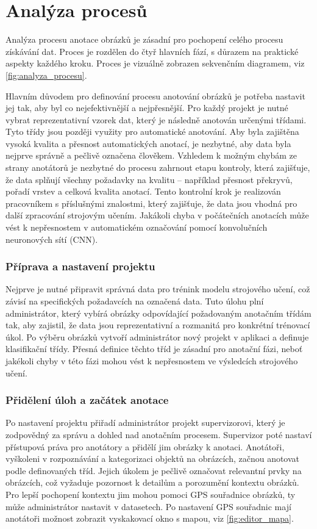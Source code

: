 \section{Analýza procesů}
Analýza procesu anotace obrázků je zásadní pro pochopení celého procesu získávání dat. Proces je rozdělen do čtyř hlavních fází, s důrazem na praktické aspekty každého kroku. Proces je vizuálně zobrazen sekvenčním diagramem, viz \vref{fig:analyza_procesu}.

Hlavním důvodem pro definování procesu anotování obrázků je potřeba nastavit jej tak, aby byl co nejefektivnější a nejpřesnější. Pro každý projekt je nutné vybrat reprezentativní vzorek dat, který je následně anotován určenými třídami. Tyto třídy jsou později využity pro automatické anotování. Aby byla zajištěna vysoká kvalita a přesnost automatických anotací, je nezbytné, aby data byla nejprve správně a pečlivě označena člověkem. Vzhledem k možným chybám ze strany anotátorů je nezbytné do procesu zahrnout etapu kontroly, která zajišťuje, že data splňují všechny požadavky na kvalitu – například přesnost překryvů, pořadí vrstev a celková kvalita anotací. Tento kontrolní krok je realizován pracovníkem s příslušnými znalostmi, který zajišťuje, že data jsou vhodná pro další zpracování strojovým učením. Jakákoli chyba v počátečních anotacích může vést k nepřesnostem v automatickém označování pomocí konvolučních neuronových sítí (CNN).


\subsubsection{Příprava a nastavení projektu}
  
  Nejprve je nutné připravit správná data pro trénink modelu strojového učení, což závisí na specifických požadavcích na označená data. Tuto úlohu plní administrátor, který vybírá obrázky odpovídající požadovaným anotačním třídám tak, aby zajistil, že data jsou reprezentativní a rozmanitá pro konkrétní trénovací úkol. Po výběru obrázků vytvoří administrátor nový projekt v aplikaci a definuje klasifikační třídy. Přesná definice těchto tříd je zásadní pro anotační fázi, neboť jakékoli chyby v této fázi mohou vést k nepřesnostem ve výsledcích strojového učení.


\subsubsection{Přidělení úloh a začátek anotace}
Po nastavení projektu přiřadí administrátor projekt supervizorovi, který je zodpovědný za správu a dohled nad anotačním procesem. Supervizor poté nastaví přístupová práva pro anotátory a přidělí jim obrázky k anotaci. Anotátoři, vyškoleni v rozpoznávání a kategorizaci objektů na obrázcích, začnou anotovat podle definovaných tříd. Jejich úkolem je pečlivě označovat relevantní prvky na obrázcích, což vyžaduje pozornost k detailům a porozumění kontextu obrázků. Pro lepší pochopení kontextu jim mohou pomoci GPS souřadnice obrázků, ty může administrátor nastavit v datasetech. Po nastavení GPS souřadnic mají anotátoři možnost zobrazit vyskakovací okno s mapou, viz \vref{fig:editor_mapa}.


